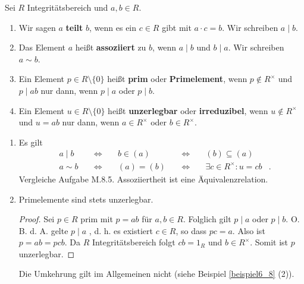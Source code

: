 \begin{definition}
	Sei $R$ Integritätsbereich und $a,b \in R$.
	\begin{enumerate}[label=(\alph*)]
		\item Wir sagen $a$ \textbf{teilt} $b$, wenn es ein $c \in R$ gibt mit $a \cdot c = b$. Wir schreiben $a \mid b$.
		\item Das Element $a$ heißt \textbf{assoziiert} zu $b$, wenn $a \mid b$ und $b \mid a$. Wir schreiben $a \sim b$.
		\item Ein Element $p \in R \setminus \{0\}$ heißt \textbf{prim} oder \textbf{Primelement}, wenn $p \notin R^\times$ und $p \mid ab$ nur dann, wenn $p \mid a$ oder $p \mid b$.
		\item Ein Element $u \in R\setminus \{0\}$ heißt \textbf{unzerlegbar} oder \textbf{irreduzibel}, wenn $u \notin R^\times$ und $u = ab$ nur dann, wenn $a \in R^\times$ oder $b \in R^\times$.
	\end{enumerate}
\end{definition}
\begin{rem}\label{rem6_7}
	\begin{enumerate}[label=(\roman*)]
		\item Es gilt
		\begin{align*}
			&a \mid b& \;&\Leftrightarrow&\; &b \in (a)& \;&\Leftrightarrow&\; &(b) \subseteq (a)&\\
			&a \sim b& \;&\Leftrightarrow&\; &(a) = (b)& \;&\Leftrightarrow&\; &\exists c \in R^\times: u = cb&.
		\end{align*}  
		Vergleiche Aufgabe M.8.5. Assoziiertheit ist eine Äquivalenzrelation.
		\item Primelemente sind stets unzerlegbar.
		\begin{proof}
			Sei $p \in R$ prim mit $p = ab$ für $a,b \in R$. Folglich gilt $p \mid a$ oder $p \mid b$. O. B. d. A. gelte $p \mid a$ , d. h. es existiert $c \in R$, so dass $pc = a$. Also ist $p = ab = pcb$. Da $R$ Integritätsbereich folgt $cb = 1_R$ und $b \in R^\times$. Somit ist $p$ unzerlegbar.
		\end{proof}
		Die Umkehrung gilt im Allgemeinen nicht (siehe Beispiel \ref{beispiel6_8} (2)).
	\end{enumerate}
\end{rem}
